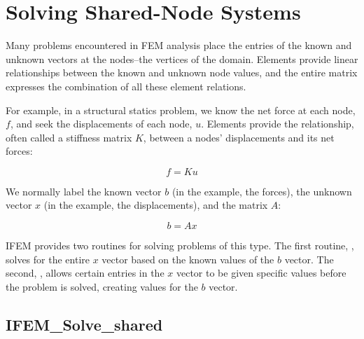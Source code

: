 \documentclass[10pt]{article}
\begin{document}
\section{Solving Shared-Node Systems}

Many problems encountered in FEM analysis place the entries of the
known and unknown vectors at the nodes--the vertices of the domain.
Elements provide linear relationships between the known and unknown node values, 
and the entire matrix expresses the combination of all these element relations.

For example, in a structural statics problem, we know the net force at
each node, $f$, and seek the displacements of each node, $u$.  Elements 
provide the relationship, often called a stiffness matrix $K$, between 
a nodes' displacements and its net forces:

\[
	f=K u
\]

We normally label the known vector $b$ (in the example, the forces), the unknown
vector $x$ (in the example, the displacements), and the matrix $A$:

\[
	b=A x
\]


IFEM provides two routines for solving problems of this type.  The first routine, , solves for the entire $x$ vector based on the known values of the $b$ vector.  The second, , allows certain entries in the $x$ vector to be given specific values before the problem is solved, creating values for the $b$ vector.


\newpage
\subsection{IFEM\_Solve\_shared}

\end{document}
